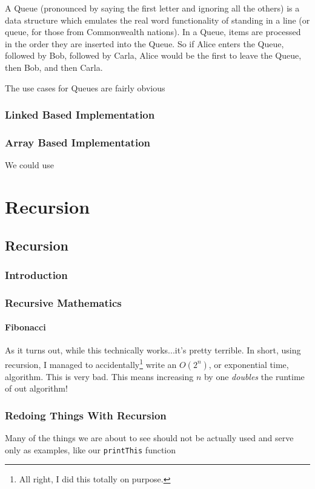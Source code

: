 \documentclass[10pt,a4paper]{book}
\begin{document}
A Queue (pronounced by saying the first letter and ignoring all the others) is a data structure which emulates the real word functionality of standing in a line (or queue, for those from Commonwealth nations).  
In a Queue, items are processed in the order they are inserted into the Queue.  So if Alice enters the Queue, followed by Bob, followed by Carla, Alice would be the first to leave the Queue, then Bob, and then Carla.

The use cases for Queues are fairly obvious

\section{Linked Based Implementation} 
\section{Array Based Implementation}
We could use 

\part{Recursion}
\chapter{Recursion}

\section{Introduction}

\section{Recursive Mathematics}

\subsection{Fibonacci}
As it turns out, while this technically works...it's pretty terrible.  In short, using recursion, I managed to accidentally\footnote{All right, I did this totally on purpose.} write an $ O(2^n) $, or exponential time,  algorithm.  This is very bad.  This means increasing $ n $ by one \emph{doubles} the runtime of out algorithm!


\section{Redoing Things With Recursion}
Many of the things we are about to see should not be actually  used and serve only as examples, like our \texttt{printThis} function
\end{document}
